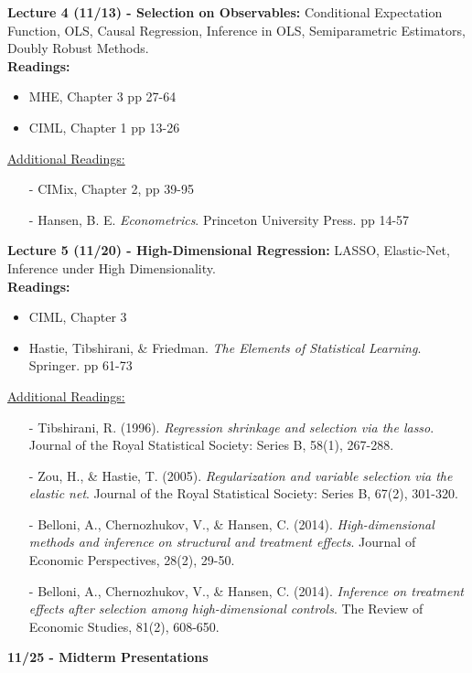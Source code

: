 \documentclass[12pt]{article}
\begin{document}
\textbf{Lecture 4 (11/13) - Selection on Observables:} Conditional Expectation Function, OLS, Causal Regression, Inference in OLS, Semiparametric Estimators, Doubly Robust Methods.\\
\textbf{Readings:}
\begin{itemize}
    \item MHE, Chapter 3 pp 27-64
    \item CIML, Chapter 1 pp 13-26
\end{itemize}
\underline{Additional Readings:}
\begin{itemize}
    \item[-] CIMix, Chapter 2, pp 39-95
    \item[-] Hansen, B. E. \emph{Econometrics}. Princeton University Press. pp 14-57
\end{itemize}

\textbf{Lecture 5 (11/20) - High-Dimensional Regression:} LASSO, Elastic-Net, Inference under High Dimensionality.\\
\textbf{Readings:}
\begin{itemize}
    \item CIML, Chapter 3
    \item Hastie, Tibshirani, \& Friedman. \emph{The Elements of Statistical Learning}. Springer. pp 61-73
\end{itemize}
\underline{Additional Readings:}
\begin{itemize}
    \item[-] Tibshirani, R. (1996). \emph{Regression shrinkage and selection via the lasso}. Journal of the Royal Statistical Society: Series B, 58(1), 267-288.
    \item[-] Zou, H., \& Hastie, T. (2005). \emph{Regularization and variable selection via the elastic net}. Journal of the Royal Statistical Society: Series B, 67(2), 301-320.
    \item[-] Belloni, A., Chernozhukov, V., \& Hansen, C. (2014). \emph{High-dimensional methods and inference on structural and treatment effects}. Journal of Economic Perspectives, 28(2), 29-50.
    \item[-] Belloni, A., Chernozhukov, V., \& Hansen, C. (2014). \emph{Inference on treatment effects after selection among high-dimensional controls}. The Review of Economic Studies, 81(2), 608-650.
\end{itemize}

\textbf{11/25 - Midterm Presentations}
\end{document}
